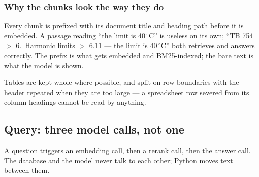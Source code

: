 \subsubsection*{Why the chunks look the way they do}
Every chunk is prefixed with its document title and heading path before it is
embedded. A passage reading ``the limit is 40\,$^{\circ}$C'' is useless on its
own; ``TB 754 $>$ 6.~Harmonic limits $>$ 6.11 --- the limit is
40\,$^{\circ}$C'' both retrieves and answers correctly. The prefix is what gets
embedded and BM25-indexed; the bare text is what the model is shown.

Tables are kept whole where possible, and split on row boundaries with the
header repeated when they are too large --- a spreadsheet row severed from its
column headings cannot be read by anything.

\subsection{Query: three model calls, not one}
A question triggers an embedding call, then a rerank call, then the answer
call. The database and the model never talk to each other; Python moves text
between them.


